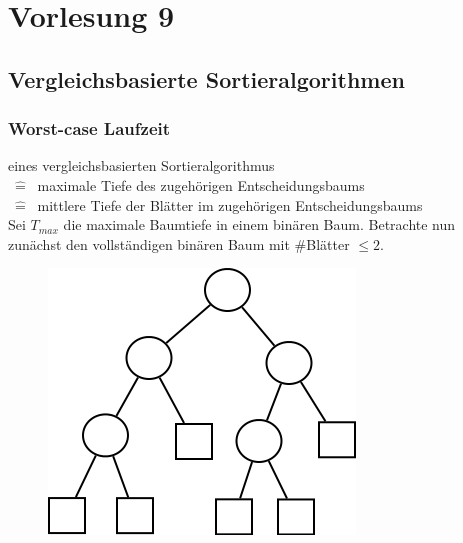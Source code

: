 \newcommand{\hl}[1]{\colorbox{yellow}{#1}}

\chapter{Vorlesung 9}
\section{Vergleichsbasierte Sortieralgorithmen}

\subsection{Worst-case Laufzeit}

eines vergleichsbasierten Sortieralgorithmus \\$~\hat{=}~$ maximale Tiefe des zugehörigen Entscheidungsbaums \\$~\hat{=}~$ mittlere Tiefe der Blätter im zugehörigen Entscheidungsbaums\\

Sei $T_{max}$ die maximale Baumtiefe in einem binären Baum. 
Betrachte nun zunächst den vollständigen binären Baum mit \#Blätter $\leq 2$. \\


\begin{figure}
\vspace{-50pt}
\includegraphics[width=\linewidth]{9/Grafik/img1.png}
\caption{}
\end{figure}

